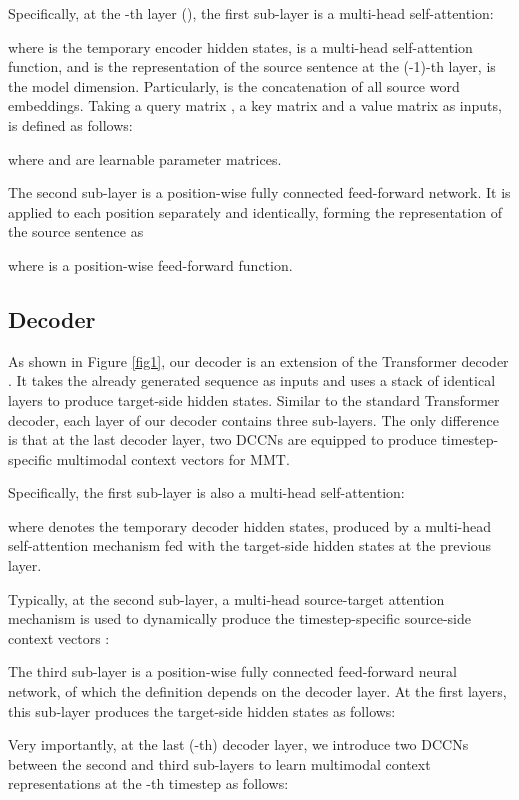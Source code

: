 \documentclass[sigconf]{acmart}
\begin{document}
Specifically,
at the -th layer (),
the first sub-layer is a multi-head self-attention: 
 
where  is the temporary encoder hidden states, 
 is a multi-head self-attention function, 
and  is the representation of the source sentence at the (-1)-th layer,  is the model dimension.
Particularly,
 is the concatenation of all source word embeddings. 
Taking a query matrix , a key matrix  and a value matrix  as inputs, 
 is defined as follows:



where  and  are learnable parameter matrices.


The second sub-layer is a position-wise fully connected feed-forward network. It is applied to each position separately and identically,
forming the representation  of the source sentence as

where  is a position-wise feed-forward function.


\subsection{Decoder}


As shown in Figure \ref{fig1},
our decoder is an extension of the Transformer decoder \cite{vaswani2017attention}.
It takes the already generated sequence as inputs and uses a stack of  identical layers to produce target-side hidden states.
Similar to the standard Transformer decoder, each layer of our decoder contains three sub-layers. 
The only difference is that at the last decoder layer,  
two DCCNs are equipped to produce timestep-specific multimodal context vectors for MMT.

Specifically, 
the first sub-layer is also a multi-head self-attention:

where  denotes the temporary decoder hidden states, produced by a multi-head self-attention mechanism fed with the target-side hidden states  at the previous layer.

Typically,
at the second sub-layer,
a multi-head source-target attention mechanism is used to dynamically produce the timestep-specific source-side context vectors :



The third sub-layer is 
a position-wise fully connected feed-forward neural network, of which the definition depends on the decoder layer. At the first  layers, this sub-layer produces the target-side hidden states  as follows:

Very importantly, at the last (-th) decoder layer, 
we introduce two DCCNs between the second and third sub-layers to  learn multimodal context representations at the -th timestep as follows: 
\end{document}
